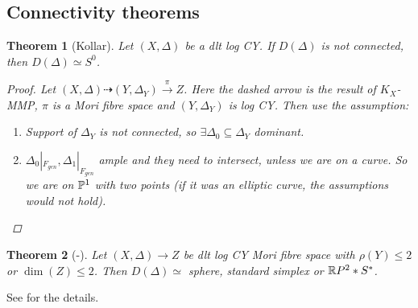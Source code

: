 \documentclass[A4paper, british, reqno]{amsart}
\theoremstyle{darkgreentheorem}
\newtheorem{thm}{Theorem}[section]
\theoremstyle{darkbluedefinition}
\theoremstyle{darkredexample}
\theoremstyle{remark}
\newcommand{\1}{\mathbbm{1}}
\newcommand{\sub}{\subseteq}
\begin{document}
\subsection{Connectivity theorems}
\begin{thm}[Kollar]
    Let $(X,\Delta)$ be a dlt log CY.
    If $D(\Delta)$ is not connected, then $D(\Delta)\simeq S^{0}$.
    \begin{proof}
	Let $(X,\Delta)\dashrightarrow (Y,\Delta_{Y})\xrightarrow{\pi} Z$.
	Here the dashed arrow is the result of $K_{X}$-MMP, $\pi$ is a Mori fibre space and $(Y,\Delta_{Y})$ is log CY.
	Then use the assumption:
	\begin{enumerate}
	    \item Support of $\Delta_{Y}$ is not connected, so $\exists \Delta_{0}\sub \Delta_{Y}$ dominant.
	    \item $\Delta_{0}|_{F_{gen}},\Delta_{1}|_{F_{gen}}$ ample and they need to intersect, unless we are on a curve.
		So we are on $\P^{1}$ with two points (if it was an elliptic curve, the assumptions would not hold).
	\end{enumerate}
    \end{proof}
\end{thm}

\begin{thm}[-]
    Let $(X,\Delta)\to Z$ be dlt log CY Mori fibre space with $\rho(Y)\leqslant 2$ or $\dim(Z)\leqslant 2$.
    Then $D(\Delta)\simeq $ sphere, standard simplex or $\R P^{2} *S^{*}$.
\end{thm}

See \cite{mau18} for the details.



\end{document}
